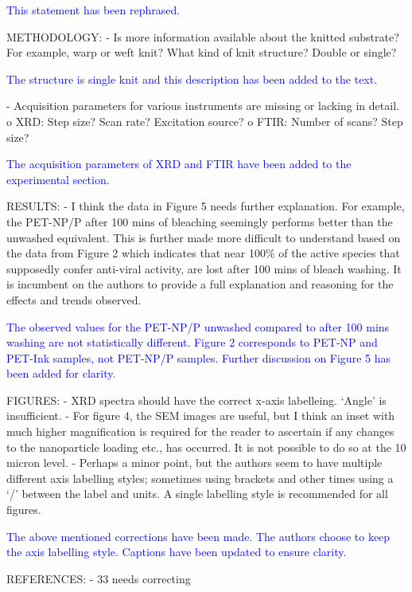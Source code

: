 \documentclass[12pt]{letter}
\newcommand{\blue}[1]{\textcolor{blue}{#1}} %
\begin{document}
\blue{This statement has been rephrased.}

METHODOLOGY:
- Is more information available about the knitted substrate? For example, warp or weft knit? What kind of knit structure? Double or single?

\blue{The structure is single knit and this description has been added to the text.}

- Acquisition parameters for various instruments are missing or lacking in detail.
o XRD: Step size? Scan rate? Excitation source?
o FTIR: Number of scans? Step size?

\blue{The acquisition parameters of XRD and FTIR have been added to the experimental section.}

RESULTS:
- I think the data in Figure 5 needs further explanation. For example, the PET-NP/P after 100 mins of bleaching seemingly performs better than the unwashed equivalent. This is further made more difficult to understand based on the data from Figure 2 which indicates that near 100\% of the active species that supposedly confer anti-viral activity, are lost after 100 mins of bleach washing. It is incumbent on the authors to provide a full explanation and reasoning for the effects and trends observed.

\blue{ The observed values for the PET-NP/P unwashed compared to after 100 mins washing are not statistically different. Figure 2 corresponds to PET-NP and PET-Ink samples, not PET-NP/P samples. Further discussion on Figure 5 has been added for clarity.}

FIGURES:
- XRD spectra should have the correct x-axis labelleing. ‘Angle’ is insufficient.
- For figure 4, the SEM images are useful, but I think an inset with much higher magnification is required for the reader to ascertain if any changes to the nanoparticle loading etc., has occurred. It is not possible to do so at the 10 micron level.
- Perhaps a minor point, but the authors seem to have multiple different axis labelling styles; sometimes using brackets and other times using a ‘/’ between the label and units. A single labelling style is recommended for all figures.

\blue{The above mentioned corrections have been made. The authors choose to keep the axis labelling style. Captions have been updated to ensure clarity. }


REFERENCES:
- 33 needs correcting
\end{document}
